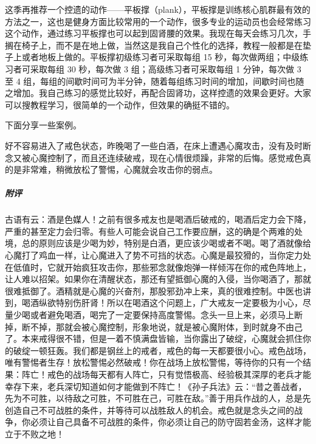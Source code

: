 这季再推荐一个控遗的动作——平板撑（plank），平板撑是训练核心肌群最有效的方法之一，这也是健身方面比较常用的一个动作，很多专业的运动员也会经常练习这个动作，通过练习平板撑也可以起到固肾腰的效果。我现在每天会练习几次，手搁在椅子上，而不是在地上做，当然这是我自己个性化的选择，教程一般都是在垫子上或者地板上做的。平板撑初级练习者可采取每组 15 秒，每次做两组；中级练习者可采取每组 30 秒，每次做 3 组；高级练习者可采取每组 1 分钟，每次做 3 至 4 组，每组的间歇时间可为半分钟，随着每组练习时间的增加，间歇时间也随之增加。我自己练习的感觉比较好，再配合固肾功，这样控遗的效果会更好。大家可以搜教程学习，很简单的一个动作，但效果的确挺不错的。

下面分享一些案例。

\begin{case}
    好不容易进入了戒色状态，昨晚喝了一些白酒，在床上遭遇心魔攻击，没有及时断念又被心魔控制了，而且还连续破戒，现在心情很烦躁，非常的后悔。感觉戒色真的是非常难，稍微放松了警惕，心魔就会攻击你的弱点。
    \subparagraph{附评} 古语有云：酒是色媒人！之前有很多戒友也是喝酒后破戒的，喝酒后定力会下降，严重的甚至定力会归零。有些人可能会说自己工作要应酬，这的确是个两难的处境，总的原则应该是少喝为妙，特别是白酒，更应该少喝或者不喝。喝了酒就像给心魔打了鸡血一样，让心魔进入了势不可挡的状态。心魔是最狡猾的，当你定力处在低值时，它就开始疯狂攻击你，那些邪念就像炮弹一样倾泻在你的戒色阵地上，让人难以招架。如果你在清醒状态，那还有望抵御心魔的入侵，当你喝酒了，那就很难抵御了。酒精就是心魔的兴奋剂，那股邪劲冲上来，真的很难控制。中医也讲到，喝酒纵欲特别伤肝肾！所以在喝酒这个问题上，广大戒友一定要极为小心，尽量少喝或者避免喝酒，喝完了一定要保持高度警惕。念头一旦上来，必须马上断掉，断不掉，那就会被心魔控制，形象地说，就是被心魔附体，到时就身不由己了。本来戒得很不错，但是一着不慎满盘皆输，当你露出了破绽，心魔就会抓住你的破绽一顿狂轰。我们都是钢丝上的戒者，戒色的每一天都要很小心。戒色战场，唯有警惕者生存！放松警惕必然破戒！你在战场上放松警惕，等待你的只有一个结果：阵亡！戒色的战场每天都有人阵亡，只有觉悟极高、经验极其深厚的老兵才能幸存下来，老兵深切知道如何才能做到不阵亡！《孙子兵法》云：“昔之善战者，先为不可胜，以待敌之可胜，不可胜在己，可胜在敌。”善于用兵作战的人，总是先创造自己不可战胜的条件，并等待可以战胜敌人的机会。戒色就是念头之间的战争，你必须让自己具备不可战胜的条件，你必须让自己的防守固若金汤，这样才能立于不败之地！
\end{case}

